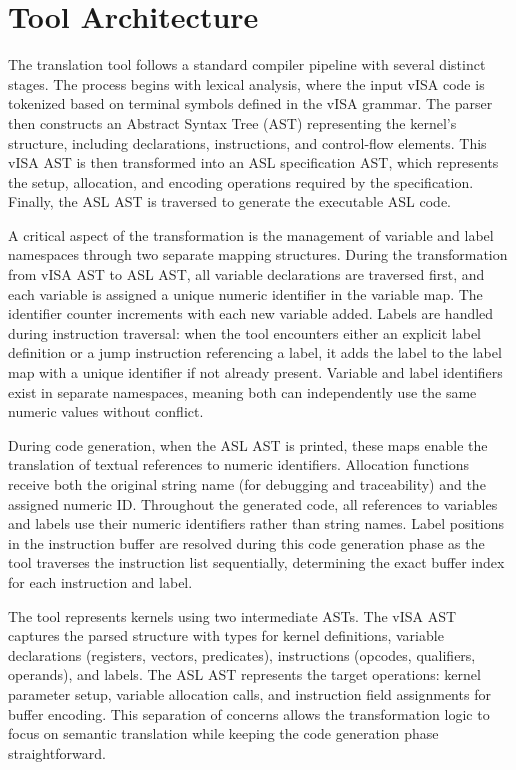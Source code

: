 \section{Tool Architecture}

The translation tool follows a standard compiler pipeline with several distinct
stages. The process begins with lexical analysis, where the input vISA code is
tokenized based on terminal symbols defined in the vISA grammar. The parser
then constructs an Abstract Syntax Tree (AST) representing the kernel's
structure, including declarations, instructions, and control-flow elements.
This vISA AST is then transformed into an ASL specification AST, which
represents the setup, allocation, and encoding operations required by the
specification. Finally, the ASL AST is traversed to generate the executable ASL
code.

A critical aspect of the transformation is the management of variable and label
namespaces through two separate mapping structures. During the transformation
from vISA AST to ASL AST, all variable declarations are traversed first, and
each variable is assigned a unique numeric identifier in the variable map. The
identifier counter increments with each new variable added. Labels are handled
during instruction traversal: when the tool encounters either an explicit label
definition or a jump instruction referencing a label, it adds the label to the
label map with a unique identifier if not already present. Variable and label
identifiers exist in separate namespaces, meaning both can independently use
the same numeric values without conflict.

During code generation, when the ASL AST is printed, these maps enable the
translation of textual references to numeric identifiers. Allocation functions
receive both the original string name (for debugging and traceability) and the
assigned numeric ID. Throughout the generated code, all references to variables
and labels use their numeric identifiers rather than string names. Label
positions in the instruction buffer are resolved during this code generation
phase as the tool traverses the instruction list sequentially, determining the
exact buffer index for each instruction and label.

The tool represents kernels using two intermediate ASTs. The vISA AST captures
the parsed structure with types for kernel definitions, variable declarations
(registers, vectors, predicates), instructions (opcodes, qualifiers, operands),
and labels. The ASL AST represents the target operations: kernel parameter
setup, variable allocation calls, and instruction field assignments for buffer
encoding. This separation of concerns allows the transformation logic to focus
on semantic translation while keeping the code generation phase
straightforward.

